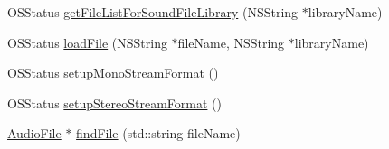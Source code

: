 \begin{DoxyCompactItemize}
O\+S\+Status \hyperlink{class_a_p_audio_file_manager_a26d042ceefccb1c736975fac512a5c72}{get\+File\+List\+For\+Sound\+File\+Library} (N\+S\+String $\ast$library\+Name)
\item 
O\+S\+Status \hyperlink{class_a_p_audio_file_manager_ac23bd578b59c7baeab62802a1a7f4e50}{load\+File} (N\+S\+String $\ast$file\+Name, N\+S\+String $\ast$library\+Name)
\item 
O\+S\+Status \hyperlink{class_a_p_audio_file_manager_a7981965b1aa9f06eeef67c349211fb53}{setup\+Mono\+Stream\+Format} ()
\item 
O\+S\+Status \hyperlink{class_a_p_audio_file_manager_a761a4bdfa40e0a6bebfddede172c0a72}{setup\+Stereo\+Stream\+Format} ()
\item 
\hyperlink{struct_audio_file}{Audio\+File} $\ast$ \hyperlink{class_a_p_audio_file_manager_ac51cd969fe764d494a262522c1cca067}{find\+File} (std\+::string file\+Name)
\end{DoxyCompactItemize}


